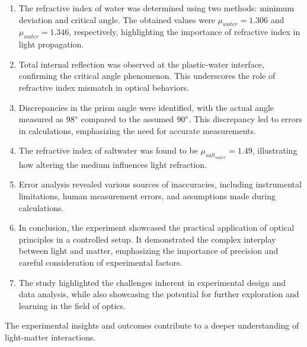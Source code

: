 \documentclass[twocolumn,11pt]{article}
\begin{document}
\begin{enumerate}
    \item The refractive index of water was determined using two methods: minimum deviation and critical angle. The obtained values were $\mu_{water} = 1.306$ and $\mu_{water} = 1.346$, respectively, highlighting the importance of refractive index in light propagation.
    
    \item Total internal reflection was observed at the plastic-water interface, confirming the critical angle phenomenon. This underscores the role of refractive index mismatch in optical behaviors.
    
    \item Discrepancies in the prism angle were identified, with the actual angle measured as $98\degree$ compared to the assumed $90\degree$. This discrepancy led to errors in calculations, emphasizing the need for accurate measurements.
    
    \item The refractive index of saltwater was found to be $\mu_{salt_{water}} = 1.49$, illustrating how altering the medium influences light refraction.
    
    \item Error analysis revealed various sources of inaccuracies, including instrumental limitations, human measurement errors, and assumptions made during calculations.
    
    \item In conclusion, the experiment showcased the practical application of optical principles in a controlled setup. It demonstrated the complex interplay between light and matter, emphasizing the importance of precision and careful consideration of experimental factors.
    
    \item The study highlighted the challenges inherent in experimental design and data analysis, while also showcasing the potential for further exploration and learning in the field of optics.
\end{enumerate}

The experimental insights and outcomes contribute to a deeper understanding of light-matter interactions.



\end{document}
